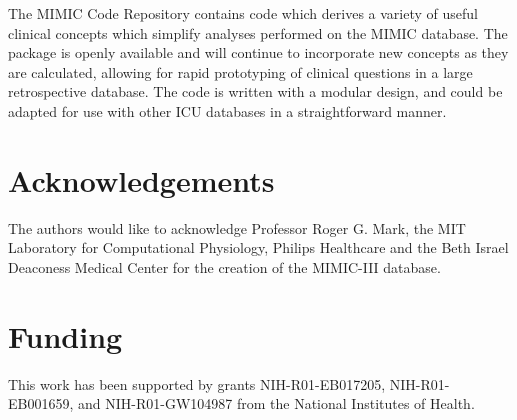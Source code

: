\documentclass{bioinfo}
\begin{document}
The MIMIC Code Repository contains code which derives a variety of useful clinical concepts which simplify analyses performed on the MIMIC database. The package is openly available and will continue to incorporate new concepts as they are calculated, allowing for rapid prototyping of clinical questions in a large retrospective database. The code is written with a modular design, and could be adapted for use with other ICU databases in a straightforward manner.  \\

\section*{Acknowledgements}

The authors would like to acknowledge Professor Roger G. Mark, the MIT Laboratory for Computational Physiology, Philips Healthcare and the Beth Israel Deaconess Medical Center for the creation of the MIMIC-III database.%

\section*{Funding}

This work has been supported by grants NIH-R01-EB017205, NIH-R01-EB001659, and NIH-R01-GW104987 from the National Institutes of Health.%

%
%
%
%
%
%
%
%
%
\end{document}
